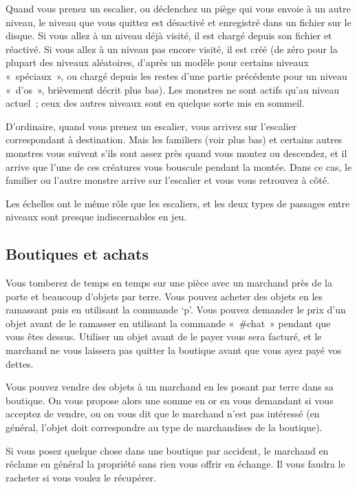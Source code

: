 \documentclass[titlepage]{article}
\begin{document}
Quand vous prenez un escalier, ou déclenchez un piège qui vous envoie à un
autre niveau, le niveau que vous quittez est désactivé et enregistré dans
un fichier sur le disque.
Si vous allez à un niveau déjà visité, il est chargé depuis son fichier et
réactivé.
Si vous allez à un niveau pas encore visité, il est créé (de zéro pour la
plupart des niveaux aléatoires, d'après un modèle pour certains niveaux
«~spéciaux~», ou chargé depuis les restes d'une partie précédente
pour un niveau «~d'os~», brièvement décrit plus bas).
Les monstres ne sont actifs qu'au niveau actuel~; ceux des autres
niveaux sont en quelque sorte mis en sommeil.


D'ordinaire, quand vous prenez un escalier, vous arrivez sur l'escalier
correspondant à destination.
Mais les familiers (voir plus bas) et certains autres monstres vous
suivent s'ils sont assez près quand vous montez ou descendez, et il arrive
que l'une de ces créatures vous bouscule pendant la montée.
Dans ce cas, le familier ou l'autre monstre arrive sur l'escalier et vous
vous retrouvez à côté.


Les échelles ont le même rôle que les escaliers, et les deux types de
passages entre niveaux sont presque indiscernables en jeu.

\subsection{Boutiques et achats}



Vous tomberez de temps en temps sur une pièce avec un marchand près de la
porte et beaucoup d'objets par terre.
Vous pouvez acheter des objets en les ramassant puis en utilisant la
commande `p'.
Vous pouvez demander le prix d'un objet avant de le ramasser en utilisant
la commande «~\#chat~» pendant que vous êtes dessus.
Utiliser un objet avant de le payer vous sera facturé, et le marchand ne
vous laissera pas quitter la boutique avant que vous ayez payé vos dettes.


Vous pouvez vendre des objets à un marchand en les posant par terre dans
sa boutique.
On vous propose alors une somme en or en vous demandant si vous acceptez de
vendre, ou on vous dit que le marchand n'est pas intéressé (en général,
l'objet doit correspondre au type de marchandises de la boutique).


Si vous posez quelque chose dans une boutique par accident, le marchand en
réclame en général la propriété sans rien vous offrir en échange.
Il vous faudra le racheter si vous voulez le récupérer.
\end{document}
